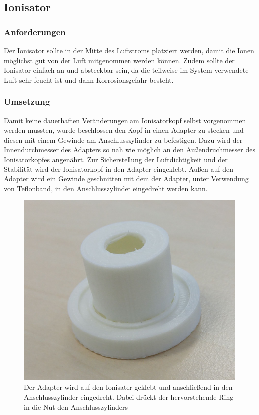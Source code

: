 \subsection{Ionisator}

\subsubsection{Anforderungen}

Der Ionisator sollte in der Mitte des Luftstroms platziert werden, damit die Ionen möglichst gut von der Luft mitgenommen werden können. Zudem sollte der Ionisator einfach an und absteckbar sein, da die teilweise im System verwendete Luft sehr feucht ist und dann Korrosionsgefahr besteht.

\subsubsection{Umsetzung}

Damit keine dauerhaften Veränderungen am Ionisatorkopf selbst vorgenommen werden mussten, wurde beschlossen den Kopf in einen Adapter zu stecken und diesen mit einem Gewinde am Anschlusszylinder zu befestigen. Dazu wird der Innendurchmesser des Adapters so nah wie möglich an den Außendruchmesser des Ionisatorkopfes angenährt. Zur Sicherstellung der Luftdichtigkeit und der Stabilität wird der Ionisatorkopf in den Adapter eingeklebt. Außen auf den Adapter wird ein Gewinde geschnitten mit dem der Adapter, unter Verwendung von Teflonband, in den Anschlusszylinder eingedreht werden kann.

\begin{figure}[h]
	\begin{center}
		\includegraphics[scale=0.17]{Adapter_Ionisator.jpg}
		\caption[Adapter für Ionisator]{Der Adapter wird auf den Ionisator geklebt und anschließend in den Anschlusszylinder eingedreht. Dabei drückt der hervorstehende Ring in die Nut den Anschlusszylinders}
	\end{center}
\end{figure}

